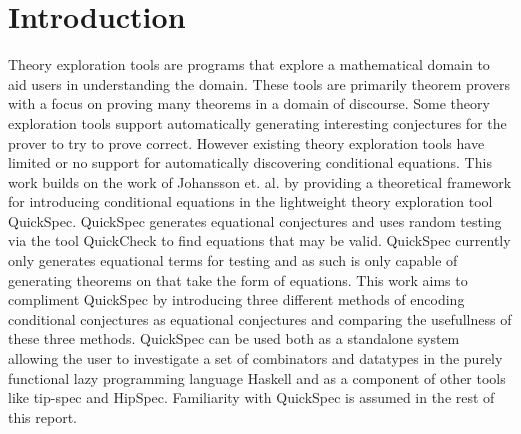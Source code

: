 \section{Introduction}
Theory exploration tools are programs that
explore a mathematical domain to aid users in
understanding the domain. %
These tools are primarily theorem provers with a focus
on proving many theorems in a domain of discourse.
Some theory exploration tools support automatically generating
interesting conjectures for the prover to try to prove correct.
However existing theory exploration tools have limited or no
support for automatically discovering conditional equations. %
This work builds on the work of Johansson et. al. %
by providing a theoretical framework for introducing conditional
equations in the lightweight theory exploration tool QuickSpec. %
QuickSpec generates equational conjectures and uses random testing via the tool QuickCheck %
to find equations that may be valid. QuickSpec currently only generates
equational terms for testing and as such is only capable of generating
theorems on that take the form of equations. 
This work aims to compliment QuickSpec by introducing three different methods
of encoding conditional conjectures as equational conjectures and comparing
the usefullness of these three methods. QuickSpec can be used both as a standalone
system allowing the user to investigate a set of combinators and datatypes in the
purely functional lazy programming language Haskell and as a component of other tools %
like tip-spec and HipSpec. %
Familiarity with QuickSpec is assumed in the rest of this report.
